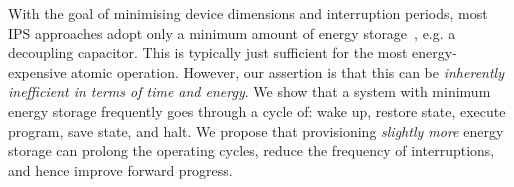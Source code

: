 









With the goal of minimising device dimensions and interruption periods, most IPS approaches adopt only a minimum amount of energy storage~\cite{balsamo2016hibernus++, 10.1145/2700249, 10.1145/2809695.2809707, 10.1145/3281300, maeng2018adaptive, balsamo2016graceful, 10.1145/3281300}, e.g. a decoupling capacitor. 
This is typically just sufficient for the most energy-expensive atomic operation. 
However, our assertion is that this can be \textit{inherently inefficient in terms of time and energy}. 
We show that a system with minimum energy storage frequently goes through a cycle of: wake up, restore state, execute program, save state, and halt.
We propose that provisioning \textit{slightly more} energy storage can prolong the operating cycles, reduce the frequency of interruptions, and hence improve forward progress. 

